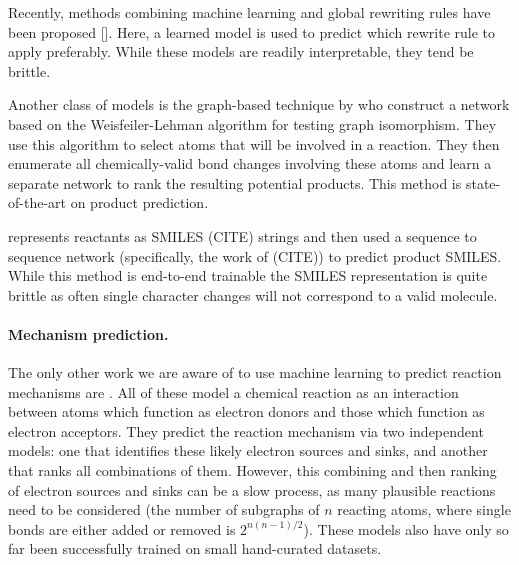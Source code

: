 Recently, methods combining machine learning and global rewriting rules have been proposed [\cite{coley2017prediction,neural-symbolic,segler2018planning,wei2016neural,zhang2005structure}]. Here, a learned model is used to predict which rewrite rule to apply preferably. While these models are readily interpretable, they tend be brittle. 

Another class of models is the graph-based technique by \cite{jin2017predicting} who construct a network based on the Weisfeiler-Lehman algorithm for testing graph isomorphism. They use this algorithm to select atoms that will be involved in a reaction. They then enumerate all chemically-valid bond changes involving these atoms and learn a separate network to rank the resulting potential products. This method is state-of-the-art on product prediction.

\cite{schwaller2017found} represents reactants as SMILES (CITE) strings and then used a sequence to sequence network (specifically, the work of (CITE)) to predict product SMILES. While this method is end-to-end trainable the SMILES representation is quite brittle as often single character changes will not correspond to a valid molecule.

\paragraph{Mechanism prediction.}
The only other work we are aware of to use machine learning to predict reaction mechanisms are \cite{fooshee2018deep,kayala2012reactionpredictor,NIPS2011_4356,kayala2011learning}.
All of these model a chemical reaction as an interaction between atoms which function as electron donors and those which function as electron acceptors. They predict the reaction mechanism via two independent models: one that identifies these likely electron sources and sinks, and another that ranks all combinations of them.
However, this combining and then ranking of electron sources and sinks can be a slow process, as many plausible reactions need to be considered (the number of subgraphs of $n$ reacting atoms, where single bonds are either added or removed is $2^{n(n-1)/2}$).
These models also have only so far been successfully trained on small hand-curated datasets.


